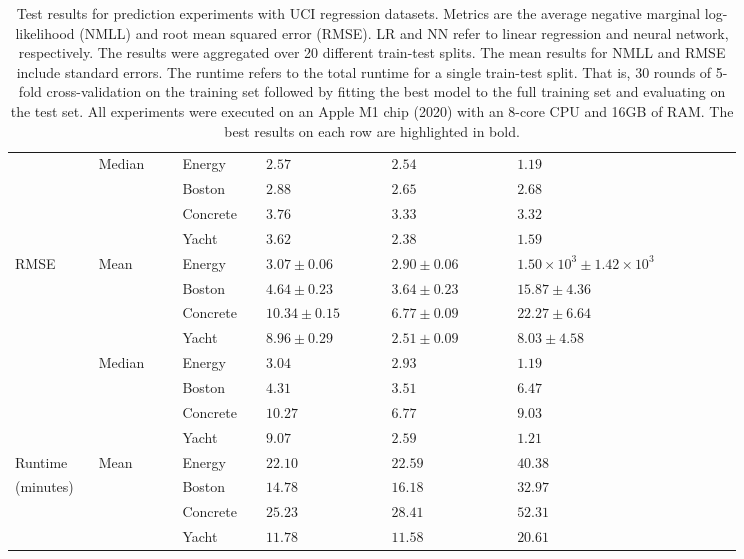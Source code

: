 \documentclass[msc,deptreport.inf]{infthesis} %
\begin{document}
\begin{table}[h!]
\begin{center}
\begin{tabular}{|| p{0.10\linewidth} p{0.10\linewidth} p{0.10\linewidth}  p{0.15\linewidth} p{0.15\linewidth} p{0.27\linewidth} ||}
					
					& Median	& Energy 		& $2.57$ 					& $2.54$ 					& $\mathbf{1.19}$ \\ 
					& 		& Boston 		& $2.88$	 				& $\mathbf{2.65}$ 			& $2.68$ \\
					& 		& Concrete 	& $3.76$ 					& $3.33$ 					& $\mathbf{3.32}$ \\ 
					& 		& Yacht 		& $3.62$ 					& $2.38$ 					& $\mathbf{1.59}$ \\
 			\hline
			RMSE 	& Mean	& Energy 	 	& $3.07 \pm 0.06$  			& $\mathbf{2.90 \pm 0.06}$ 	& $1.50 \times 10^{3} \pm 1.42 \times 10^{3}$ \\ 
					& 		& Boston 	 	& $4.64 \pm 0.23$ 			& $\mathbf{3.64 \pm 0.23}$ 	& $15.87 \pm 4.36$ \\ 
					& 		& Concrete  	& $10.34 \pm 0.15$ 			& $\mathbf{6.77 \pm 0.09}$ 	& $22.27 \pm 6.64$ \\ 
 					& 		& Yacht 		& $8.96 \pm 0.29$ 			& $\mathbf{2.51 \pm 0.09}$ 	& $8.03 \pm 4.58$ \\ 
				 	& Median	& Energy  		& $3.04$ 					& $2.93$ 					& $\mathbf{1.19}$ \\ 
					& 		& Boston  		& $4.31$ 					& $\mathbf{3.51}$ 			& $6.47$ \\ 
					& 		& Concrete  	& $10.27$ 				& $\mathbf{6.77}$ 			& $9.03$ \\ 
 					& 		& Yacht  		& $9.07$ 					& $2.59$ 					& $\mathbf{1.21}$ \\ 
			\hline			
			Runtime 	& Mean	& Energy 	 	& $\mathbf{22.10}$   		& $22.59$  				& $40.38$  \\ 
			(minutes)	&		& Boston 	 	& $\mathbf{14.78}$			& $16.18$					& $32.97$ \\ 
					&		& Concrete 	& $\mathbf{25.23}$			& $28.41$					& $52.31$ \\ 
 					&		& Yacht 		& $11.78$					& $\mathbf{11.58}$			& $20.61$\\ [1ex] 
			\hline
		\end{tabular}
		\caption{Test results for prediction experiments with UCI regression datasets. Metrics are the average negative marginal log-likelihood (NMLL) and root mean squared error (RMSE). LR and NN refer to linear regression and neural network, respectively. The  results were aggregated over 20 different train-test splits. The mean results for NMLL and RMSE include standard errors. The runtime refers to the total runtime for a single train-test split. That is, 30 rounds of 5-fold cross-validation on the training set followed by fitting the best model to the full training set and evaluating on the test set. All experiments were executed on an Apple M1 chip (2020) with an 8-core CPU and 16GB of RAM. The best results on each row are highlighted in bold.}
		\label{table:neural_nets_uci}
	\end{center}
\end{table}
\end{document}
